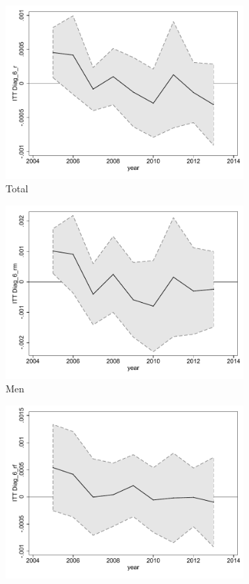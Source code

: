 \documentclass[a4paper ]{article}
\begin{document}
\begin{figure}[h!]
	\centering
	\begin{subfigure}[t]{0.31\textwidth}
		\centering
		\includegraphics[width=0.99\textwidth]{R1_LC_Diag_6_r}
		\caption{Total}		
	\end{subfigure}
	\begin{subfigure}[t]{0.31\textwidth}
		\centering
		\includegraphics[width=0.99\textwidth]{R1_LC_Diag_6_rm}
		\caption{Men}		
	\end{subfigure}
	\quad
	\begin{subfigure}[t]{0.31\textwidth}
		\centering
		\includegraphics[width=0.99\textwidth]{R1_LC_Diag_6_rf}

\end{subfigure}
\end{figure}
\end{document}
